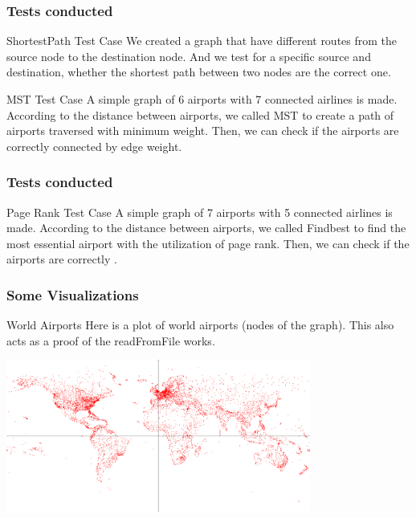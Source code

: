 \documentclass{beamer}
\begin{document}
\begin{frame}
\frametitle{Tests conducted}
\begin{block}{ShortestPath Test Case}
    We created a graph that have different routes from the source node to the destination node. And we test for a specific source and destination, whether the shortest path between two nodes are the correct one.
\end{block}
\begin{block}{MST Test Case}
    A simple graph of 6 airports with 7 connected airlines is made. According to the distance between airports, we called MST to create a path of airports traversed with minimum weight. Then, we can check if the airports are correctly connected by edge weight. 
\end{block}
\end{frame}

\begin{frame}
\frametitle{Tests conducted}

\begin{block}{Page Rank Test Case}
    A simple graph of 7 airports with 5 connected airlines is made. According to the distance between airports, we called Findbest to find the most essential airport with the utilization of page rank. Then, we can check if the airports are correctly . 
\end{block}
\end{frame}

\begin{frame}
\frametitle{Some Visualizations}
\begin{block}{World Airports}
    Here is a plot of world airports (nodes of the graph). This also acts as a proof of the readFromFile works.
    \begin{center}
        \includegraphics[width=10cm]{plots/world-airports.png}
    \end{center}
    
\end{block}
\end{frame}
\end{document}
